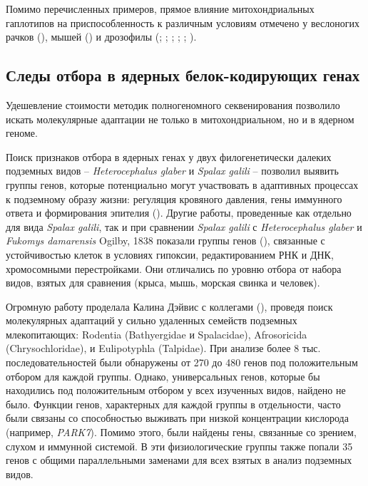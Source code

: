 Помимо перечисленных примеров, прямое влияние митохондриальных гаплотипов на приспособленность к различным условиям отмечено у веслоногих рачков (\cite{Schizas2001}), мышей (\cite{Takeda2000}) и дрозофилы (\cite{Nigro1994}; \cite{Hutter1995}; \cite{Kilpatrick1995}; \cite{Stordeur1997}; \cite{Rand2001}; \cite{James2003}). 


\subsection{Следы отбора в ядерных белок-кодирующих генах}

Удешевление стоимости методик полногеномного секвенирования позволило искать молекулярные адаптации не только в митохондриальном, но и в ядерном геноме.

Поиск признаков отбора в ядерных генах у двух филогенетически далеких подземных видов -- \textit{Heterocephalus glaber} и \textit{Spalax galili} -- позволил выявить группы генов, которые потенциально могут участвовать в адаптивных процессах к подземному образу жизни: регуляция кровяного давления, гены иммунного ответа и формирования эпителия (\cite{Fang2015}). Другие работы, проведенные как отдельно для вида \textit{Spalax galili}, так и при сравнении \textit{Spalax galili} с \textit{Heterocephalus glaber} и \textit{Fukomys damarensis} Ogilby, 1838 показали группы генов (\cite{Fang2015}), связанные с устойчивостью клеток в условиях гипоксии, редактированием РНК и ДНК, хромосомными перестройками. Они отличались по уровню отбора от набора видов, взятых для сравнения (крыса, мышь, морская свинка и человек). 

Огромную работу проделала Калина Дэйвис с коллегами (\cite{Davies2018}), проведя поиск молекулярных адаптаций у сильно удаленных семейств подземных млекопитающих: Rodentia (Bathyergidae и Spalacidae), Afrosoricida (Chrysochloridae), и Eulipotyphla (Talpidae). При анализе более 8 тыс. последовательностей были обнаружены от 270 до 480 генов под положительным отбором для каждой группы. Однако, универсальных генов, которые бы находились под положительным отбором у всех изученных видов, найдено не было. Функции генов, характерных для каждой группы в отдельности, часто были связаны со способностью выживать при низкой концентрации кислорода (например, \textit{PARK7}). Помимо этого, были найдены гены, связанные со зрением, слухом и иммунной системой. В эти физиологические группы также попали 35 генов с общими параллельными заменами для всех взятых в анализ подземных видов. 



